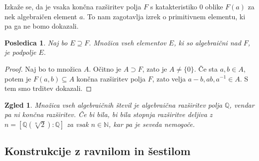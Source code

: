 \documentclass[10pt, a4paper]{article}
\newtheorem{posledica}[izr]{Posledica}
\newtheorem{zgled}{Zgled}[section]
\newenvironment{noticeC}{%
  \tcolorbox[%
  notitle,
  empty,
  enhanced,  %
  breakable,
  coltext=black, 
  fontupper=\rmfamily,
  noparskip,
  sharp corners,
  boxrule=-1pt,  %
  frame hidden,
  left=7pt,  %
  right=7pt,
  top=5pt,
  bottom=5pt,
  before skip=2.5ex plus 2pt,
  after skip=2.5ex plus 2pt,
  overlay unbroken and last={%
  },
  ]}
{\endtcolorbox}
\newenvironment{dokaz}%
  {\begin{noticeC}\begin{proof}}%
  {\end{proof}\end{noticeC}}
\newcommand{\N}{\mathbb {N}}
\newcommand{\Q}{\mathbb {Q}}
\begin{document}
Izkaže se, da je vsaka končna razširitev polja $F$ s katakteristiko $0$ oblike $F(a)$
za nek algebraičen element $a$. To nam zagotavlja izrek o primitivnem elementu, ki pa ga ne bomo dokazali.

\begin{posledica}
  Naj bo $E \supseteq F$. Množica vseh elementov $E$, ki so algebraični nad $F$, je podpolje $E$.
\end{posledica}

\begin{dokaz}
  Naj bo to množica $A$. Očitno je $A \supset F$, zato je $A \neq \{0\}$. Če sta $a, b \in A$, potem je 
  $F(a, b) \subseteq A$ končna razširitev polja $F$, zato velja $a -b, ab, a^{-1} \in A$. S tem smo trditev dokazali.
\end{dokaz}

\begin{zgled}
  Množica vseh algebraičnih števil je algebraična razširitev polja $\Q$, vendar pa ni končna razširitev.
  Če bi bila, bi bila stopnja razširitve deljiva z $n = [\Q (\sqrt[n]{2}) : \Q]$ za vsak $n \in \N$,
  kar pa je seveda nemogoče.
\end{zgled}

\subsection{Konstrukcije z ravnilom in šestilom}
\end{document}
